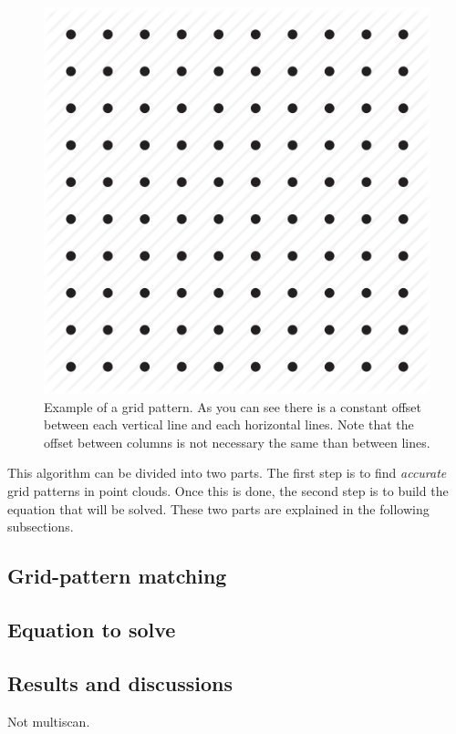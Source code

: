 \begin{figure}[H]
 \centering
 \includegraphics[scale=0.5]{img/grid1.png}
 \caption{Example of a grid pattern. As you can see there is a constant offset between each vertical line and each horizontal lines. Note that the offset between columns is not necessary the same than between lines.}
 \label{fig:grid1}
\end{figure}

This algorithm can be divided into two parts. The first step is to find \emph{accurate} grid patterns in point clouds. Once this is done, the second step is to build the equation that will be solved. These two parts are explained in the following subsections.

\subsection{Grid-pattern matching}


\subsection{Equation to solve}


\subsection{Results and discussions}
Not multiscan.


